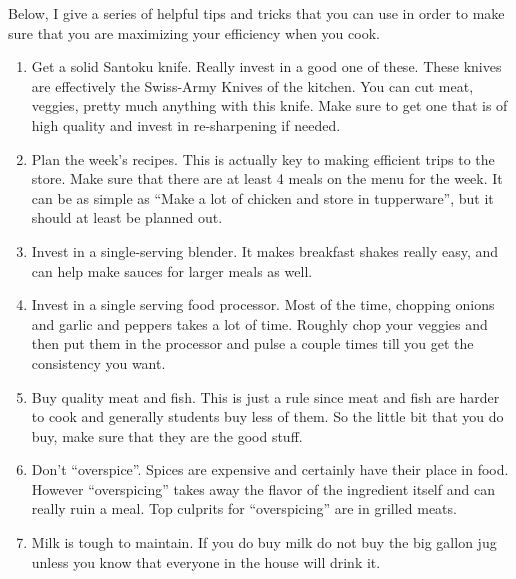 

Below, I give a series of helpful tips and tricks that you can use in order to make sure that you are maximizing your efficiency when you cook. 

\begin{enumerate}
\item Get a solid Santoku knife. Really invest in a good one of these. These knives are effectively the Swiss-Army Knives of the kitchen. You can cut meat, veggies, pretty much anything with this knife. Make sure to get one that is of high quality and invest in re-sharpening if needed. 
\item Plan the week's recipes. This is actually key to making efficient trips to the store. Make sure that there are at least 4 meals on the menu for the week. It can be as simple as ``Make a lot of chicken and store in tupperware'', but it should at least be planned out. 
\item Invest in a single-serving blender. It makes breakfast shakes really easy, and can help make sauces for larger meals as well.
\item Invest in a single serving food processor. Most of the time, chopping onions and garlic and peppers takes a lot of time. Roughly chop your veggies and then put them in the processor and pulse a couple times till you get the consistency you want. 
\item Buy quality meat and fish. This is just a rule since meat and fish are harder to cook and generally students buy less of them. So the little bit that you do buy, make sure that they are the good stuff.
\item Don't ``overspice''. Spices are expensive and certainly have their place in food. However ``overspicing'' takes away the flavor of the ingredient itself and can really ruin a meal. Top culprits for ``overspicing'' are in grilled meats. 
\item Milk is tough to maintain. If you do buy milk do not buy the big gallon jug unless you know that everyone in the house will drink it. 
\end{enumerate}
